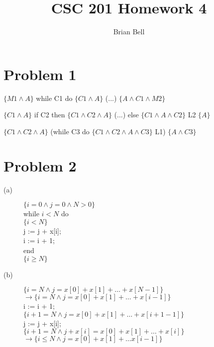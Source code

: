 \documentclass[11pt]{article}
\begin{document}
\title{CSC 201 Homework 4}
\author{Brian Bell\\
}
\renewcommand{\today}{April 28, 2009}
\maketitle
\section*{Problem 1}
\begin{description} 
\item $\{M1\wedge A\}$ while C1 do $\{C1\wedge A\}$ (...) $\{A\wedge \!C1\wedge M2\}$
\item $\{C1\wedge A\}$ if C2 then $\{C1\wedge C2\wedge A\}$ (...) else $\{C1\wedge A\wedge \!C2\}$ L2 $\{A\}$
\item $\{C1\wedge C2\wedge A\}$ (while C3 do $\{C1\wedge C2\wedge A\wedge C3\}$ L1) $\{A\wedge \!C3\}$
\end{description}
\section*{Problem 2}
\begin{description}
\item[(a)]
$\{i = 0 \wedge j = 0 \wedge N > 0\}$\\
while $i < N$ do\\
$\{i < N\}$\\
j := j + x[i];\\
i := i + 1;\\
end \\
$\{i \ge N \}$\\
\item[(b)]
$\{i = N \wedge j = x[0] + x[1] + \ldots + x[N-1]\}$\\
$\rightarrow \{i = N \wedge j = x[0] + x[1] + \ldots + x[i-1]\}$\\
i := i + 1;\\
$\{i + 1 = N \wedge j = x[0] + x[1] + \ldots + x[i+1 - 1]\}$\\
j := j + x[i];\\
$\{i + 1 = N \wedge j + x[i] = x[0] + x[1] + \ldots + x[i]\}$ \\
$\rightarrow \{i \le N \wedge j = x[0] + x[1] + \ldots x[i-1]\}$\\
\end{description}
\end{document}
